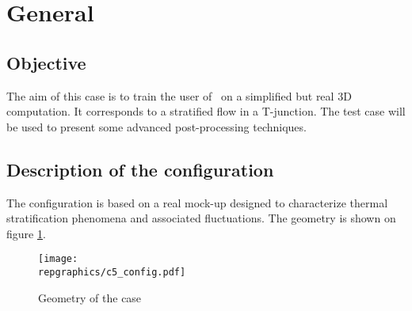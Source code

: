 %
% 
%
% 
% 
% 
%
\section{General}

	\subsection{Objective}

The aim of this case is to train the user of \CS\ on a simplified but real 3D
computation. It corresponds to a stratified flow in a T-junction. The test case
will be used to present some advanced post-processing techniques.


	\subsection{Description of the configuration}

The configuration is based on a real mock-up designed to characterize thermal
stratification phenomena and associated fluctuations. The geometry is shown on
figure \ref{config}.


\begin{figure}[h!]
\begin{center}
\texttt{[image: \\repgraphics/c5\_config.pdf]} 
\caption{Geometry of the case}
\label{config}
\end{center}
\end{figure}

